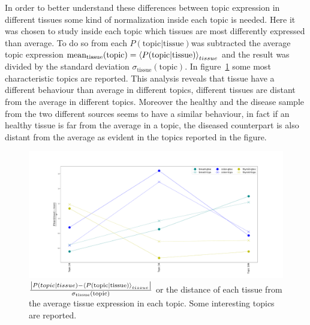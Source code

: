 In order to better understand these differences between topic expression in different tissues some kind of normalization inside each topic is needed. Here it was chosen to study inside each topic which tissues are most differently expressed than average. To do so from each $P(\text{topic}| \text{tissue})$was subtracted the average topic expression $\text{mean}_{\text{tissue}}(\text{topic})=\left\langle P(\text{topic}| \text{tissue})\right\rangle_{tissue}$ and the result was divided by the standard deviation $\sigma_{\text{tissue}}(\text{topic})$. In figure~\ref{fig:topic/merged/lifeplot_normalised_level3_hd} some most characteristic topics are reported. This analysis reveals that tissue have a different behaviour than average in different topics, different tissues are distant from the average in different topics. Moreover the healthy and the disease sample from the two different sources seems to have a similar behaviour, in fact if an healthy tissue is far from the average in a topic, the diseased counterpart is also distant from the average as evident in the topics reported in the figure.
\begin{figure}[htb!]
	\centering
	\includegraphics[width=0.8\linewidth]{pictures/topic/merged/lifeplot_normalised_level3_hd.pdf}
	\caption{$\frac{\left|P(topic | tissue) - \left\langle P(\text{topic}| \text{tissue})\right\rangle_{tissue}\right|}{\sigma_{\text{tissue}}(\text{topic})}$ or the distance of each tissue from the average tissue expression in each topic. Some interesting topics are reported.}
	\label{fig:topic/merged/lifeplot_normalised_level3_hd}
\end{figure}
